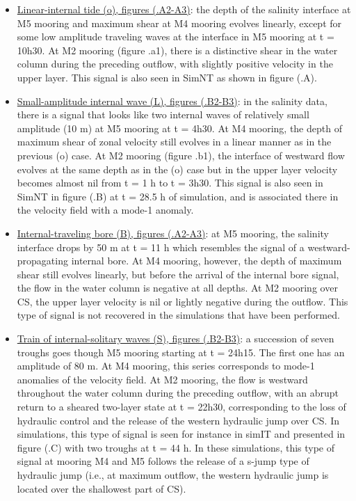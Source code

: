 \begin{itemize}
\item \underline{Linear-internal tide (o), figures (.A2-A3)}: the depth of the salinity interface at M5 mooring and maximum shear at M4 mooring evolves linearly, except for some low amplitude traveling waves at the interface in M5 mooring at t = 10h30. At M2 mooring (figure .a1), there is a distinctive shear in the water column during the preceding outflow, with slightly positive velocity in the upper layer. This signal is also seen in SimNT as shown in figure (.A).
%
\item \underline{Small-amplitude internal wave (L), figures (.B2-B3)}: in the salinity data, there is a signal that looks like two internal waves of relatively small amplitude (10 m) at M5 mooring at t = 4h30. At M4 mooring, the depth of maximum shear of zonal velocity still evolves in a linear manner as in the previous (o) case. At M2 mooring (figure .b1), the interface of westward flow evolves at the same depth as in the (o) case but in the upper layer velocity becomes almost nil from t = 1 h to t = 3h30. This signal is also seen in SimNT in figure (.B) at t = 28.5 h of simulation, and is associated there in the velocity field with a mode-1 anomaly.
%
\item \underline{Internal-traveling bore (B), figures (.A2-A3)}: at M5 mooring, the salinity interface drops by 50 m at t = 11 h which resembles the signal of a westward-propagating internal bore. At M4 mooring, however, the depth of maximum shear still evolves linearly, but before the arrival of the internal bore signal, the flow in the water column is negative at all depths. At M2 mooring over CS, the upper layer velocity is nil or lightly negative during the outflow. This type of signal is not recovered in the simulations that have been performed.
%
\item \underline{Train of internal-solitary waves (S), figures (.B2-B3)}: a succession of seven troughs goes though M5 mooring starting at t = 24h15. The first one has an amplitude of 80 m. At M4 mooring, this series corresponds to mode-1 anomalies of the velocity field. At M2 mooring, the flow is westward throughout the water column during the preceding outflow, with an abrupt return to a sheared two-layer state at t = 22h30, corresponding to the loss of hydraulic control and the release of the western hydraulic jump over CS. In simulations, this type of signal is seen for instance in simIT and presented in figure (.C) with two troughs at  t = 44 h. In these simulations, this type of signal at mooring M4 and M5 follows the release of a s-jump type of hydraulic jump (i.e., at maximum outflow, the western hydraulic jump is located over the shallowest part of CS).

\end{itemize}
